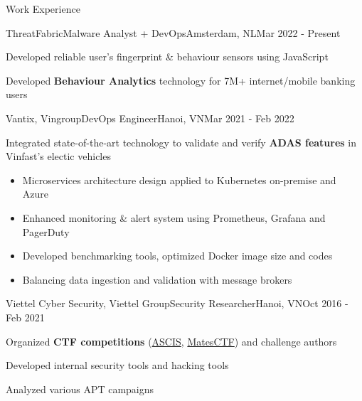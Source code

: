 \documentclass{article}
\newlength{\tabin}
\newlength{\secsep}
\newcommand{\lineunder}{\vspace*{-8pt} \\ \hspace*{-6pt} \hrulefill \\ \vspace*{-15pt}}
\newenvironment{tabbedsection}[1]{
  \begin{list}{}{
      \setlength{\itemsep}{0pt}
      \setlength{\labelsep}{0pt}
      \setlength{\labelwidth}{0pt}
      \setlength{\leftmargin}{\tabin}
      \setlength{\rightmargin}{\tabin}
      \setlength{\listparindent}{0pt}
      \setlength{\parsep}{0pt}
      \setlength{\parskip}{0pt}
      \setlength{\partopsep}{0pt}
      \setlength{\topsep}{#1}
    }
  \item[]
}{\end{list}}
\newenvironment{resume_section}[1]{
  \filbreak
  \vspace{2\secsep}
  \textsc{\large#1}
  \lineunder
  \begin{tabbedsection}{\secsep}
}{\end{tabbedsection}}
\newenvironment{subitems}{
  \renewcommand{\labelitemi}{-}
  \begin{itemize}
      \setlength{\labelsep}{1em}
}{\end{itemize}}
\newenvironment{resume_employer}[4]{
  \vspace{\secsep}
  \textbf{#1} \\ 
  \indent {\small #2} \hfill {\footnotesize#3 (#4)}
  \begin{tabbedsection}{0pt}
  \begin{subitems}
}{\end{subitems}\end{tabbedsection}}
\begin{document}
  \begin{resume_section}{Work Experience}

    \begin{resume_employer}{ThreatFabric}{Malware Analyst + DevOps}{Amsterdam, NL}{Mar 2022 - Present}
      \item Developed reliable user's fingerprint \& behaviour sensors using JavaScript
      \item Developed \textbf{Behaviour Analytics} technology for 7M+ internet/mobile banking users
    \end{resume_employer}

    \begin{resume_employer}{Vantix, Vingroup}{DevOps Engineer}{Hanoi, VN}{Mar 2021 - Feb 2022}
      \item Integrated state-of-the-art technology to validate and verify \textbf{ADAS features} in Vinfast's electic vehicles
      \begin{subitems}
        \item Microservices architecture design applied to Kubernetes on-premise and Azure
        \item Enhanced monitoring \& alert system using Prometheus, Grafana and PagerDuty
        \item Developed benchmarking tools, optimized Docker image size and codes
        \item Balancing data ingestion and validation with message brokers
      \end{subitems}
    \end{resume_employer}
    
    \begin{resume_employer}{Viettel Cyber Security, Viettel Group}{Security Researcher}{Hanoi, VN}{Oct 2016 - Feb 2021}
      \item Organized \textbf{CTF competitions} (\href{https://ascis.vnisa.org.vn/}{ASCIS}, \href{https://www.facebook.com/matesctf/}{MatesCTF}) and challenge authors
      \item Developed internal security tools and hacking tools
      \item Analyzed various APT campaigns
    \end{resume_employer}

  \end{resume_section}
\end{document}
